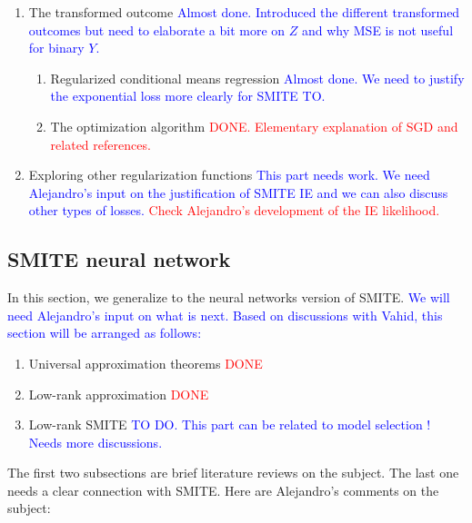 \documentclass{article}
\begin{document}
\begin{enumerate}
    \item The transformed outcome \textcolor{blue}{Almost done. Introduced the different transformed outcomes but need to elaborate a bit more on $Z$ and why MSE is not useful for binary $Y$.}
    \begin{enumerate}
        \item[a.1)] Regularized conditional means regression \textcolor{blue}{Almost done. We need to justify the exponential loss more clearly for SMITE TO.}
        \item[a.2)] The optimization algorithm \textcolor{red}{DONE. Elementary explanation of SGD and related references.}
    \end{enumerate} 
    \item Exploring other regularization functions \textcolor{blue}{This part needs work. We need Alejandro's input on the justification of SMITE IE and we can also discuss other types of losses.} \textcolor{red}{Check Alejandro's development of the IE likelihood.}
\end{enumerate}



\subsection{SMITE neural network}



In this section, we generalize to the neural networks version of SMITE. \textcolor{blue}{We will need Alejandro's input on what is next. Based on discussions with Vahid, this section will be arranged as follows:}

\begin{enumerate}
    \item Universal approximation theorems \textcolor{red}{DONE}
    \item Low-rank approximation \textcolor{red}{DONE} 
    \item Low-rank SMITE \textcolor{blue}{TO DO. This part can be related to model selection ! Needs more discussions.}
\end{enumerate}

The first two subsections are brief literature reviews on the subject. The last one needs a clear connection with SMITE. Here are Alejandro's comments on the subject: 
\end{document}
